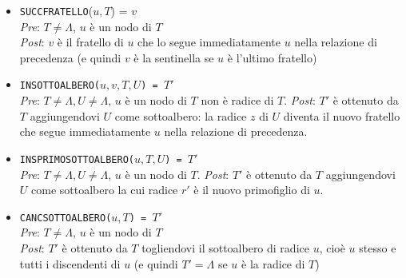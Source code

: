 \documentclass[12pt]{report}
\begin{document}
\begin{itemize}
		\item \texttt{SUCCFRATELLO}($u, T$) = $v$ \\
		\quad \textit{Pre}: $T \neq \Lambda$, $u$ è un nodo di $T$ \\
		\quad \textit{Post}: $v$ è il fratello di $u$ che lo segue immediatamente $u$ nella relazione di precedenza (e quindi $v$ è la sentinella se $u$ è l'ultimo fratello)
		\item \texttt{INSOTTOALBERO($u, v, T, U$) = $T'$} \\
		\quad \textit{Pre}: $T \neq \Lambda, U \neq \Lambda$, $u$ è un nodo di $T$ non è radice di $T$.
		\quad \textit{Post}: $T'$ è ottenuto da $T$ aggiungendovi $U$ come sottoalbero: la radice $z$ di $U$ diventa il nuovo fratello che segue immediatamente $u$ nella relazione di precedenza.
		\item \texttt{INSPRIMOSOTTOALBERO($u, T, U$) = $T'$} \\
		\quad \textit{Pre}: $T \neq \Lambda, U \neq \Lambda$, $u$ è un nodo di $T$.
		\quad \textit{Post}: $T'$ è ottenuto da $T$ aggiungendovi $U$ come sottoalbero la cui radice $r'$ è il nuovo primofiglio di $u$.
		\item \texttt{CANCSOTTOALBERO($u, T$) = $T'$} \\
		\quad \textit{Pre}: $T \neq \Lambda$, $u$ è un nodo di $T$ \\
		\quad \textit{Post}: $T'$ è ottenuto da $T$ togliendovi il sottoalbero di radice $u$, cioè $u$ stesso e tutti i discendenti di $u$ (e quindi $T'=\Lambda$ se $u$ è la radice di $T$)
  \end{itemize}
\end{document}
